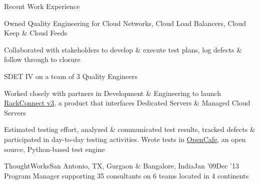 \documentclass{resume} %
\begin{document}
\begin{rSection}{Recent Work Experience}
\begin{rSubsection}{}{}{}{}
\item Owned Quality Engineering for Cloud Networks, Cloud Load Balancers, Cloud Keep \& Cloud Feeds
\item Collaborated with stakeholders to develop \& execute test plans, log defects \& follow through to closure

\end{rSubsection}\vspace{-1em}






  \begin{rSubsection}{}{}{}{}
{SDET IV on a team of 3 Quality Engineers}

\item Worked closely with partners in Development \& Engineering to launch \href{https://support.rackspace.com/how-to/introducing-rackconnect-v30/}{RackConnect v3}, a product that interfaces Dedicated Servers \& Managed Cloud Servers
\item Estimated testing effort, analyzed \& communicated test results, tracked defects \& participated in day-to-day testing activities. Wrote tests in \href{https://github.com/CafeHub/opencafe}{OpenCafe}, an open source, Python-based test engine

\end{rSubsection}





\begin{rSubsection}{ThoughtWorks}{San Antonio, TX, Gurgaon \& Bangalore, India}{Jan '09}{Dec '13}
    {Program Manager supporting 35 consultants on 6 teams located in 4 continents}


\end{rSubsection}
\end{rSection}
\end{document}
